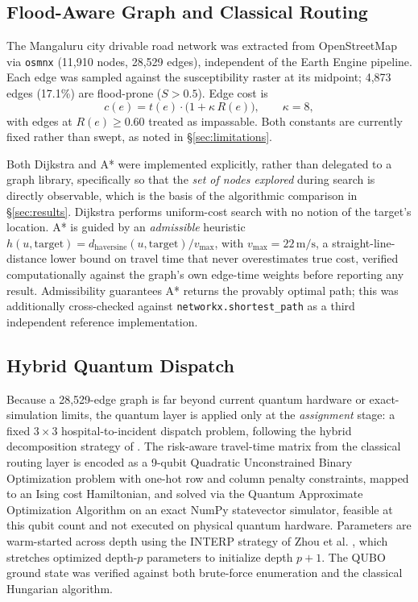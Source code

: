 \documentclass[conference]{IEEEtran}
\begin{document}
\subsection{Flood-Aware Graph and Classical Routing}
\label{sec:routing-method}
The Mangaluru city drivable road network was extracted from OpenStreetMap via \texttt{osmnx} (11{,}910 nodes, 28{,}529 edges), independent of the Earth Engine pipeline. Each edge was sampled against the susceptibility raster at its midpoint; 4{,}873 edges (17.1\%) are flood-prone ($S>0.5$). Edge cost is
\begin{equation}
c(e) = t(e)\cdot\bigl(1 + \kappa\, R(e)\bigr), \qquad \kappa = 8,
\label{eq:edgecost}
\end{equation}
with edges at $R(e)\geq 0.60$ treated as impassable. Both constants are currently fixed rather than swept, as noted in \S\ref{sec:limitations}.

Both Dijkstra and A* were implemented explicitly, rather than delegated to a graph library, specifically so that the \emph{set of nodes explored} during search is directly observable, which is the basis of the algorithmic comparison in \S\ref{sec:results}. Dijkstra performs uniform-cost search with no notion of the target's location. A* is guided by an \emph{admissible} heuristic $h(u,\mathrm{target}) = d_{\mathrm{haversine}}(u,\mathrm{target}) / v_{\max}$, with $v_{\max}=22\,\mathrm{m/s}$, a straight-line-distance lower bound on travel time that never overestimates true cost, verified computationally against the graph's own edge-time weights before reporting any result. Admissibility guarantees A* returns the provably optimal path; this was additionally cross-checked against \texttt{networkx.shortest\_path} as a third independent reference implementation.

\subsection{Hybrid Quantum Dispatch}
Because a 28{,}529-edge graph is far beyond current quantum hardware or exact-simulation limits, the quantum layer is applied only at the \emph{assignment} stage: a fixed $3\times3$ hospital-to-incident dispatch problem, following the hybrid decomposition strategy of \cite{fitzek2024,shekhawat2025}. The risk-aware travel-time matrix from the classical routing layer is encoded as a 9-qubit Quadratic Unconstrained Binary Optimization problem with one-hot row and column penalty constraints, mapped to an Ising cost Hamiltonian, and solved via the Quantum Approximate Optimization Algorithm on an exact NumPy statevector simulator, feasible at this qubit count and not executed on physical quantum hardware. Parameters are warm-started across depth using the INTERP strategy of Zhou et al. \cite{zhou2020}, which stretches optimized depth-$p$ parameters to initialize depth $p{+}1$. The QUBO ground state was verified against both brute-force enumeration and the classical Hungarian algorithm.
\end{document}
